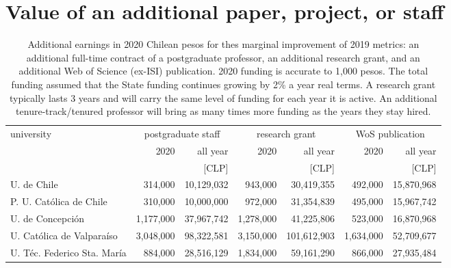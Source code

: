 \documentclass[twocolumn]{article}
\begin{document}
\section{Value of an additional paper, project, or staff}
\begin{table}[t]
\centering
\caption{Additional earnings in 2020 Chilean pesos for thes marginal improvement of 2019 metrics: an additional full-time contract of a postgraduate professor, an additional research grant, and an additional Web of Science (ex-ISI) publication.  2020 funding is accurate to 1,000 pesos. The total funding assumed that the State funding continues growing by 2\% a year real terms.  A research grant typically lasts 3 years and will carry the same level of funding for each year it is active.  An additional tenure-track/tenured professor will bring as many times more funding as the years they stay hired.}
\label{tab:sciencecost}
\begin{tabular}{l rr rr rr}
\hline\hline
university                     & 
                          \multicolumn{2}{c}{postgraduate staff} & 
                                                                \multicolumn{2}{c}{research grant} & 
                                                                                                 \multicolumn{2}{c}{WoS publication} \\
                               &          2020 & all year        &          2020 & all year        &          2020 & all year        \\
                               &               & [CLP]           &               & [CLP]           &               & [CLP]           \\
\hline
U. de Chile                    &       314,000 &      10,129,032 &       943,000 &      30,419,355 &       492,000 &      15,870,968 \\
P. U. Católica de Chile        &       310,000 &      10,000,000 &       972,000 &      31,354,839 &       495,000 &      15,967,742 \\
U. de Concepción               &     1,177,000 &      37,967,742 &     1,278,000 &      41,225,806 &       523,000 &      16,870,968 \\
U. Católica de Valparaíso      &     3,048,000 &      98,322,581 &     3,150,000 &     101,612,903 &     1,634,000 &      52,709,677 \\
U. Téc. Federico Sta. María    &       884,000 &      28,516,129 &     1,834,000 &      59,161,290 &       866,000 &      27,935,484 \\

\end{tabular}
\end{table}
\end{document}
